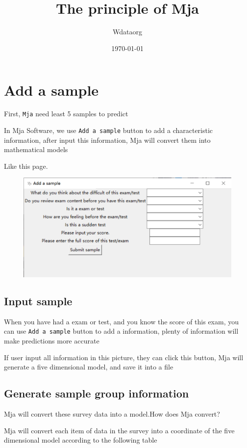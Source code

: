 \documentclass{article}
\author{Wdataorg}
\date{\today}
\title{The principle of Mja}
\begin{document}
\maketitle
\tableofcontents
\section{Add a sample}
First, \verb|Mja| need least 5 samples to predict


In Mja Software, we use \verb|Add a sample| button to add a 
characteristic information, after input this information, Mja
will convert them into mathematical models


Like this page.
\begin{figure}[htbp]
    \centering
    \includegraphics{addsamplepage.png}
\end{figure} 


\subsection{Input sample}
When you have had a exam or test, and you know the score of this exam,
you can use \verb|Add a sample| button to add a information, plenty of information
will make predictions more accurate


If user input all information in this picture, 
they can click this button, Mja will generate a five dimensional model, and save it 
into a file
\subsection{Generate sample group information}
Mja will convert these survey data into a model.How does Mja convert?


Mja will convert each item of data in the survey into a coordinate of the 
five dimensional model 
according to the following table
\end{document}
